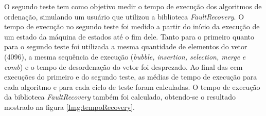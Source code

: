 O segundo teste tem como objetivo medir o tempo de execução dos algoritmos de ordenação, simulando um usuário que utilizou a biblioteca \textit{FaultRecovery}. O tempo de execução no segundo teste foi medido a partir do início da execução de um estado da máquina de estados até o fim dele. Tanto para o primeiro quanto para o segundo teste foi utilizada a mesma quantidade de elementos do vetor (4096), a mesma sequência de execução (\textit{bubble, insertion, selection, merge} \textit{e comb}) e o tempo de desordenação do vetor foi desprezado. Ao final das cem execuções do primeiro e do segundo teste, as médias de tempo de execução para cada algoritmo e para cada ciclo de teste foram calculadas. O tempo de execução da biblioteca \textit{FaultRecovery} também foi calculado, obtendo-se o resultado mostrado na figura \ref{Img:tempoRecovery}.

